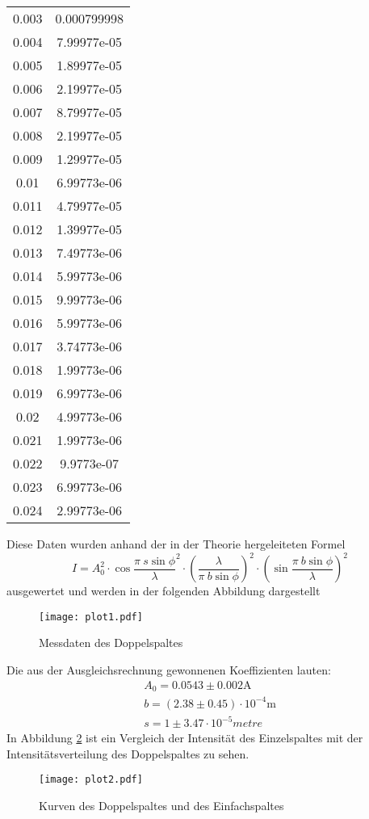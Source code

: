 \begin{table}[H]
\begin{tabular}{c c}
  0.003       & 0.000799998 \\
  0.004       & 7.99977e-05 \\
  0.005       & 1.89977e-05 \\
  0.006       & 2.19977e-05 \\
  0.007       & 8.79977e-05 \\
  0.008       & 2.19977e-05 \\
  0.009       & 1.29977e-05 \\
  0.01        & 6.99773e-06 \\
  0.011       & 4.79977e-05 \\
  0.012       & 1.39977e-05 \\
  0.013       & 7.49773e-06 \\
  0.014       & 5.99773e-06 \\
  0.015       & 9.99773e-06 \\
  0.016       & 5.99773e-06 \\
  0.017       & 3.74773e-06 \\
  0.018       & 1.99773e-06 \\
  0.019       & 6.99773e-06 \\
  0.02        & 4.99773e-06 \\
  0.021       & 1.99773e-06 \\
  0.022       & 9.9773e-07  \\
  0.023       & 6.99773e-06 \\
  0.024       & 2.99773e-06 \\
  \bottomrule
  \end{tabular}
  \end{table}
  Diese Daten wurden anhand der in der Theorie hergeleiteten Formel 
  \begin{equation*}
    I= A_0^2\cdot \cos{\dfrac{\pi\ s \sin{\phi}}{\lambda}}^2 \cdot
    (\dfrac{\lambda}{\pi \ b \sin{\phi}})^2 \cdot (\sin{\dfrac{\pi\ b \sin{\phi}}{\lambda}})^2
  \end{equation*}
  ausgewertet und werden in der folgenden Abbildung dargestellt
  \begin{figure}
    \centering
    \texttt{[image: plot1.pdf]}
    \caption{Messdaten des Doppelspaltes}
    \label{fig:p}
  \end{figure}
  Die aus der Ausgleichsrechnung gewonnenen Koeffizienten lauten:
  \begin{align*}
    A_0 = 0.0543 \pm 0.002 \si{\ampere}\\
    b = (2.38 \pm 0.45)\cdot 10^{-4} \si{\metre}\\
    s = 1 \pm 3.47 \cdot 10^{-5} \si{metre}
  \end{align*}
  In Abbildung \ref{fig:verleich} ist ein Vergleich der Intensität des Einzelspaltes mit der 
  Intensitätsverteilung des Doppelspaltes zu sehen.
  \begin{figure}
    \centering
    \texttt{[image: plot2.pdf]}
    \caption{Kurven des Doppelspaltes und des Einfachspaltes}
    \label{fig:verleich}
  \end{figure}